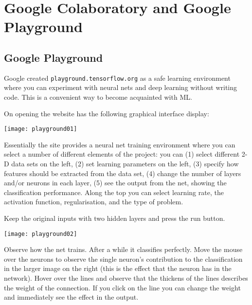 
\chapter{Google Colaboratory and Google Playground}
\label{sec:GoogleColaboratoryPlayground}

\section{Google Playground}
\label{sec:playground.tensorflow.org}

Google created \lstinline{playground.tensorflow.org}
\cite{GooglePlayground2019} as a safe learning environment where you can experiment with neural nets and deep learning without writing code.  This is a convenient way to become acquainted with \ac{ML}.

On opening the website has the following graphical interface display: 
 
\begin{figure*}[h]
\texttt{[image: playground01]}
\end{figure*}

Essentially the site provides a neural net training environment where you can select a number of different elements of the project: you can 
(1) select different \ac{2-D} data sets on the left, 
(2) set learning parameters on the left,
(3) specify how features  should be extracted from the data set,
(4) change the number of layers and/or neurons in each layer,
(5) see the output from the net, showing the classification performance.
Along the top you can select learning rate, the activation function, regularisation, and the type of problem. 

Keep the original inputs with two hidden layers and press the run button. 

\begin{figure*}[h]
\texttt{[image: playground02]}
\end{figure*}
\FloatBarrier

Observe how the net trains. After a while it classifies perfectly.  Move the mouse over the neurons to observe the single neuron's contribution to the classification in the larger image on the right (this is the effect that the neuron has in the network). Hover over the lines and observe that the thickens of the lines describes the weight of the connection. If you click on the line you can change the weight and immediately see the effect in the output. 

